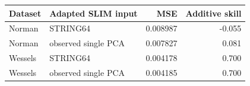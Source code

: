 \begin{tabular}{llrr}
\toprule
Dataset & Adapted SLIM input & MSE & Additive skill \\
\midrule
Norman & STRING64 & 0.008987 & -0.055 \\
Norman & observed single PCA & 0.007827 & 0.081 \\
Wessels & STRING64 & 0.004178 & 0.700 \\
Wessels & observed single PCA & 0.004185 & 0.700 \\
\bottomrule
\end{tabular}
